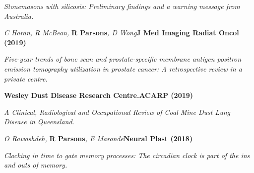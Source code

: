     \textit{Stonemasons with silicosis: Preliminary findings and a warning message from Australia.}
\item
    \textit{C Haran, R McBean, }\textbf{R Parsons}\textit{, D Wong}\textbf{\hfill J Med Imaging Radiat Oncol (2019)}\par 
    \textit{Five-year trends of bone scan and prostate-specific membrane antigen positron emission tomography utilization in prostate cancer: A retrospective review in a private centre.}
\item
    \textbf{Wesley Dust Disease Research Centre.}\textbf{\hfill ACARP (2019)}\par 
    \textit{A Clinical, Radiological and Occupational Review of Coal Mine Dust Lung Disease in Queensland.}
\item
    \textit{O Rawashdeh, }\textbf{R Parsons}\textit{, E Maronde}\textbf{\hfill Neural Plast (2018)}\par 
    \textit{Clocking in time to gate memory processes: The circadian clock is part of the ins and outs of memory.}
